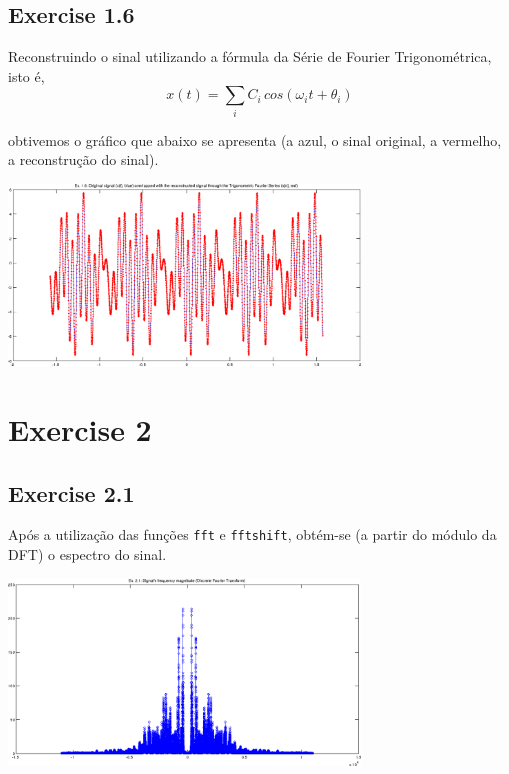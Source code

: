 \documentclass[a4paper]{article}
\begin{document}
\subsection{Exercise 1.6}
\noindent Reconstruindo o sinal utilizando a fórmula da Série de Fourier Trigonométrica, isto é,
\begin{equation}
	x(t) = \sum_{i} C_{i} \, cos(\omega_{i} t + \theta_{i})
\end{equation}

\noindent obtivemos o gráfico que abaixo se apresenta (a azul, o sinal original, a vermelho, a reconstrução do sinal).
\begin{center}
	\includegraphics[width=0.70\textwidth]{images/ex_1_6.png}
	\label{fig:ex_1_6}
\end{center}

\clearpage
\section{Exercise 2}
\subsection{Exercise 2.1}
\noindent Após a utilização das funções \texttt{fft} e \texttt{fftshift}, obtém-se (a partir do módulo da DFT) o espectro do sinal.
\begin{center}
	\includegraphics[width=0.70\textwidth]{images/ex_2_1.png}
	\label{fig:ex_2_1}
\end{center}
\end{document}
